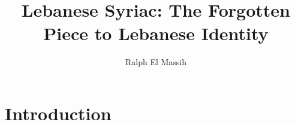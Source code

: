 \documentclass{report}
\title{Lebanese Syriac: The Forgotten Piece to Lebanese Identity}
\author{Ralph El Massih}
\begin{document}
\maketitle

\section*{Introduction}
\end{document}
